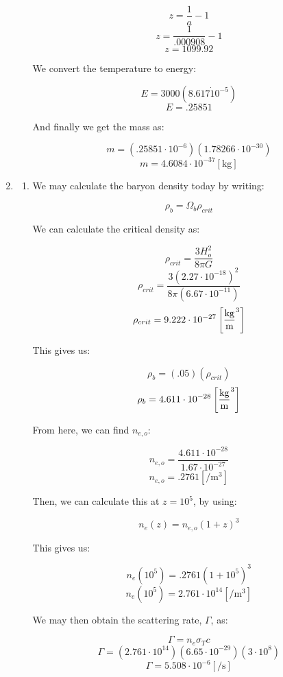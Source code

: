 \begin{enumerate}
\begin{enumerate}
        $$z=\frac{1}{a}-1$$
        $$z=\frac{1}{.000908}-1$$
        $$\boxed{z=1099.92}$$

        We convert the temperature to energy:

        $$E=3000(8.617\dot10^{-5})$$
        $$\boxed{E=.25851}$$

        And finally we get the mass as:

        $$m=(.25851\cdot10^{-6})(1.78266\cdot10^{-30})$$
        $$\boxed{m=4.6084\cdot10^{-37}[\si{\kilo\gram}]}$$

    \end{enumerate}

  \item

    \begin{enumerate}

      \item We may calculate the baryon density today by writing:

        $$\rho_b=\Omega_b\rho_{crit}$$

        We can calculate the critical density as:

        $$\rho_{crit}=\frac{3H_o^2}{8\pi G}$$
        $$\rho_{crit}=\frac{3(2.27\cdot10^{-18})^2}{8\pi(6.67\cdot10^{-11})}$$
        $$\rho_{crit}=9.222\cdot10^{-27}\left[ \si{\kilo\gram\over\meter\cubed} \right]$$

        This gives us:

        $$\rho_b=(.05)(\rho_{crit})$$
        $$\rho_b=4.611\cdot10^{-28}\left[ \si{\kilo\gram\over\meter\cubed} \right]$$

        From here, we can find $n_{e,o}$:

        $$n_{e,o}=\frac{4.611\cdot10^{-28}}{1.67\cdot10^{-27}}$$
        $$n_{e,o}=.2761\left[ \si{\per\meter\cubed} \right]$$

        Then, we can calculate this at $z=10^5$, by using:

        $$n_e(z)=n_{e,o}(1+z)^3$$

        This gives us:

        $$n_e(10^5)=.2761(1+10^5)^3$$
        $$\boxed{n_e(10^5)=2.761\cdot10^{14}[\si{\per\meter\cubed}]}$$

        We may then obtain the scattering rate, $\Gamma$, as:

        $$\Gamma=n_e\sigma_Tc$$
        $$\Gamma=(2.761\cdot10^{14})(6.65\cdot10^{-29})(3\cdot10^8)$$
        $$\boxed{\Gamma=5.508\cdot10^{-6}[\si{\per\second}]}$$


\end{enumerate}
\end{enumerate}
